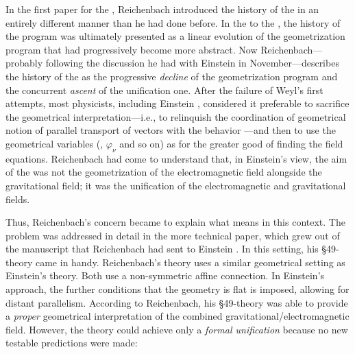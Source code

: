 \documentclass[final]{article}
\newcommand{\PRZL}{\citetitle{Reichenbach1928}\xspace}
\begin{document}
In the first paper for the , Reichenbach introduced the history of the \uft in an entirely different manner than he had done before. In the \Ap to the \PRZL, the history of the \uft program was ultimately presented as a linear evolution of the geometrization program that had progressively become more abstract. Now Reichenbach---probably following the discussion he had with Einstein in November---describes the history of the \uft as the progressive \emph{decline} of the geometrization program and the concurrent \emph{ascent} of the unification one. After the failure of Weyl's first attempts, most physicists, including Einstein , considered it preferable to sacrifice the geometrical interpretation---i.e., to relinquish the coordination of geometrical notion of parallel transport of vectors with the behavior \rac---and then to use the geometrical variables (\Gtmn, $\varphi_\nu$ and so on) as  for the greater good of finding the field equations. Reichenbach had come to understand that, in Einstein's view, the aim of the \uftp was not the geometrization of the electromagnetic field alongside the gravitational field; it was the unification of the electromagnetic and gravitational fields. 


Thus, Reichenbach's concern became to explain what  means in this context. The problem was addressed in detail in the more technical paper, which grew out of the manuscript that Reichenbach had sent to Einstein \citep{Reichenbach1929a}.  In this setting, his \S49-theory came in handy. Reichenbach's theory uses a similar geometrical setting as Einstein's theory. Both use a non-symmetric affine connection. In Einstein's approach, the further conditions that the geometry is flat is imposed, allowing for distant parallelism. According to Reichenbach, his \S49-theory was able to provide a \emph{proper} geometrical interpretation of the combined gravitational/electromagnetic field. However, the theory could achieve only a \emph{formal unification} because no new testable predictions were made:
\end{document}
